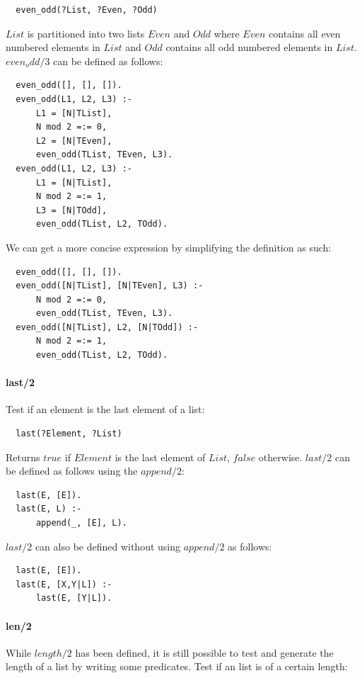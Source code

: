 \documentclass{article}
\begin{document}
\begin{multicols}{2}
  \begin{lstlisting}
  even_odd(?List, ?Even, ?Odd)
  \end{lstlisting} 
  
  $List$ is partitioned into two lists $Even$ and $Odd$ where $Even$ contains all even numbered elements in $List$ and $Odd$ contains all odd numbered elements in $List$. $even_odd/3$ can be defined as follows:

  \begin{lstlisting}
  even_odd([], [], []).
  even_odd(L1, L2, L3) :- 
      L1 = [N|TList],
      N mod 2 =:= 0,
	  L2 = [N|TEven],
      even_odd(TList, TEven, L3).
  even_odd(L1, L2, L3) :- 
      L1 = [N|TList],
      N mod 2 =:= 1,
	  L3 = [N|TOdd],
      even_odd(TList, L2, TOdd).
  \end{lstlisting} 
  
  We can get a more concise expression by simplifying the definition as such:

  \begin{lstlisting}
  even_odd([], [], []).
  even_odd([N|TList], [N|TEven], L3) :- 
      N mod 2 =:= 0,
      even_odd(TList, TEven, L3).
  even_odd([N|TList], L2, [N|TOdd]) :- 
      N mod 2 =:= 1,
      even_odd(TList, L2, TOdd).
  \end{lstlisting} 
  
  \paragraph{last/2} Test if an element is the last element of a list:
  
  \begin{lstlisting}
  last(?Element, ?List)
  \end{lstlisting} 
  
  Returns $true$ if $Element$ is the last element of $List$, $false$ otherwise. $last/2$ can be defined as follows using the $append/2$:
  
  \begin{lstlisting}
  last(E, [E]).
  last(E, L) :-
      append(_, [E], L).
  \end{lstlisting} 
  
  $last/2$ can also be defined without using $append/2$ as follows:  
  
  \begin{lstlisting}
  last(E, [E]).
  last(E, [X,Y|L]) :-
      last(E, [Y|L]).
  \end{lstlisting} 
  
  \paragraph{len/2} While $length/2$ has been defined, it is still possible to test and generate the length of a list by writing some predicates. Test if an list is of a certain length:
  

\end{multicols}
\end{document}
